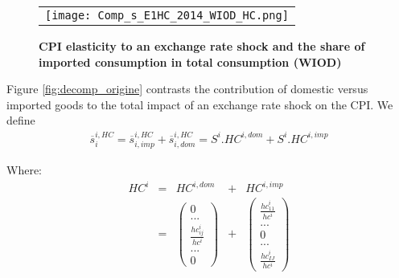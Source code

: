 \documentclass[11pt,a4paper]{article}
\begin{document}
\begin{figure}[!h]
	\centering
	\caption{\footnotesize{\textbf{CPI elasticity to an exchange rate shock and the share of imported consumption in total consumption (WIOD)}}}
	\begin{tabular}{c}
		\texttt{[image: Comp\_s\_E1HC\_2014\_WIOD\_HC.png]}\\
	\end{tabular}
	\label{fig:WIOD_HC_E1HC}
\end{figure}


%


Figure \ref{fig:decomp_origine} contrasts the contribution of domestic versus imported goods to the total impact of an exchange rate shock on the CPI.
We define 
\begin{eqnarray}
\overline{s}_i^{i,HC}=\overline{s}_{i,imp}^{i,HC} + \overline{s}_{i,dom}^{i,HC} = S^i.HC^{i,dom}+ S^i.HC^{i,imp}
\label{equ:decomp_impexp}
\end{eqnarray}

Where:
\begin{equation}
\begin{array}{ccccc}
HC^i&=&HC^{i,dom} & + &  HC^{i,imp} \\ 
&=&  \left( \begin{array}{c}
	0 \\
	...\\
	\frac{{hc}_{ij}^i}{hc^i}\\
	...\\
	0
	 \end{array}
	 \right)
&+&
\left( 	\begin{array}{c} \frac{{hc}_{11}^i}{hc^i} \\	...\\0\\...\\\frac{{hc}_{IJ}^i}{hc^i}\end{array}\right) 
\end{array}
\end{equation}
\end{document}
